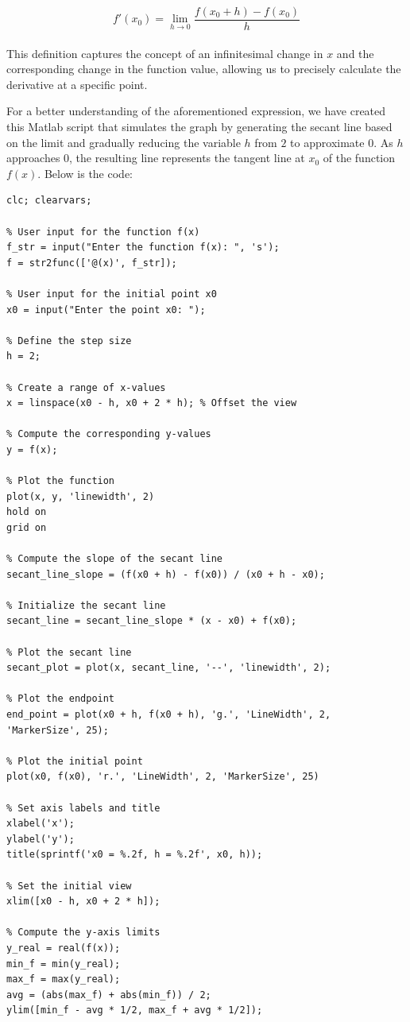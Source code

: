 \documentclass[13pt,a4paper]{report}
\begin{document}
$$f'\left(x_0\right)=\lim_{h\to 0}\dfrac{f\left(x_0 + h\right) - f\left(x_0\right)}{h}$$\\[-1cm]

This definition captures the concept of an infinitesimal change in $x$ and the corresponding change in the function value, allowing us to precisely calculate the derivative at a specific point.

For a better understanding of the aforementioned expression, we have created this Matlab script that simulates the graph by generating the secant line based on the limit and gradually reducing the variable $h$ from $2$ to approximate $0$. As $h$ approaches $0$, the resulting line represents the tangent line at $x_0$ of the function $f(x)$. Below is the code:\\[-0.3cm]

\begin{verbatim}
clc; clearvars;

% User input for the function f(x)
f_str = input("Enter the function f(x): ", 's');
f = str2func(['@(x)', f_str]);

% User input for the initial point x0
x0 = input("Enter the point x0: ");

% Define the step size
h = 2;

% Create a range of x-values
x = linspace(x0 - h, x0 + 2 * h); % Offset the view

% Compute the corresponding y-values
y = f(x);

% Plot the function
plot(x, y, 'linewidth', 2)
hold on
grid on

% Compute the slope of the secant line
secant_line_slope = (f(x0 + h) - f(x0)) / (x0 + h - x0);

% Initialize the secant line
secant_line = secant_line_slope * (x - x0) + f(x0);

% Plot the secant line
secant_plot = plot(x, secant_line, '--', 'linewidth', 2);

% Plot the endpoint
end_point = plot(x0 + h, f(x0 + h), 'g.', 'LineWidth', 2, 'MarkerSize', 25);

% Plot the initial point
plot(x0, f(x0), 'r.', 'LineWidth', 2, 'MarkerSize', 25)

% Set axis labels and title
xlabel('x');
ylabel('y');
title(sprintf('x0 = %.2f, h = %.2f', x0, h));

% Set the initial view
xlim([x0 - h, x0 + 2 * h]);

% Compute the y-axis limits
y_real = real(f(x));
min_f = min(y_real);
max_f = max(y_real);
avg = (abs(max_f) + abs(min_f)) / 2;
ylim([min_f - avg * 1/2, max_f + avg * 1/2]);


\end{verbatim}
\end{document}
